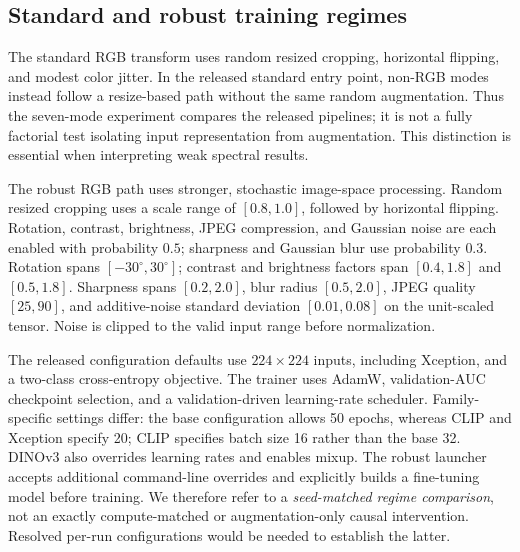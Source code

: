 \documentclass[conference,10pt,letterpaper]{IEEEtran}
\begin{document}
\subsection{Standard and robust training regimes}
The standard RGB transform uses random resized cropping, horizontal flipping, and modest color jitter. In the released standard entry point, non-RGB modes instead follow a resize-based path without the same random augmentation. Thus the seven-mode experiment compares the released pipelines; it is not a fully factorial test isolating input representation from augmentation. This distinction is essential when interpreting weak spectral results.

The robust RGB path uses stronger, stochastic image-space processing. Random resized cropping uses a scale range of $[0.8,1.0]$, followed by horizontal flipping. Rotation, contrast, brightness, JPEG compression, and Gaussian noise are each enabled with probability $0.5$; sharpness and Gaussian blur use probability $0.3$. Rotation spans $[-30^\circ,30^\circ]$; contrast and brightness factors span $[0.4,1.8]$ and $[0.5,1.8]$. Sharpness spans $[0.2,2.0]$, blur radius $[0.5,2.0]$, JPEG quality $[25,90]$, and additive-noise standard deviation $[0.01,0.08]$ on the unit-scaled tensor. Noise is clipped to the valid input range before normalization.

The released configuration defaults use $224\times224$ inputs, including Xception, and a two-class cross-entropy objective. The trainer uses AdamW, validation-AUC checkpoint selection, and a validation-driven learning-rate scheduler. Family-specific settings differ: the base configuration allows 50 epochs, whereas CLIP and Xception specify 20; CLIP specifies batch size 16 rather than the base 32. DINOv3 also overrides learning rates and enables mixup. The robust launcher accepts additional command-line overrides and explicitly builds a fine-tuning model before training. We therefore refer to a \emph{seed-matched regime comparison}, not an exactly compute-matched or augmentation-only causal intervention. Resolved per-run configurations would be needed to establish the latter.
\end{document}
